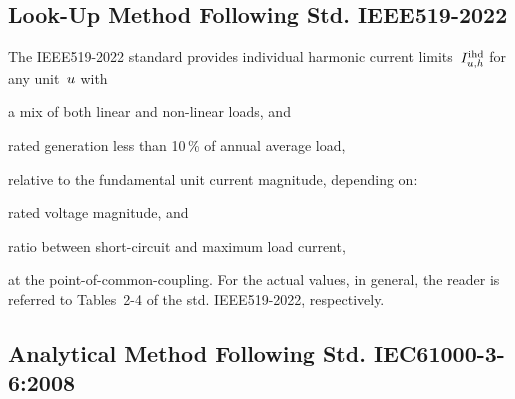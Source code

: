 \subsection{Look-Up Method Following Std. IEEE519-2022}
\label{sec:ieee519-2022}

The IEEE519-2022 standard provides individual harmonic current limits~$I^{\text{ihd}}_{u,h}$ for any unit~$u$ with 
\begin{enumerate*}
    \item [a)] a mix of both linear and non-linear loads, and 
    \item [b)] rated generation less than 10\,\% of annual average load,
\end{enumerate*}
relative to the fundamental unit current magnitude, depending on:
\begin{enumerate*}
    \item [a)] rated voltage magnitude, and 
    \item [b)] ratio between short-circuit and maximum load current,
\end{enumerate*}
at the point-of-common-coupling. For the actual values, in general, the reader is referred to Tables~2-4 of the std. IEEE519-2022, respectively.
\subsection{Analytical Method Following Std. IEC61000-3-6:2008}
\label{sec:iec61000-3-6}


